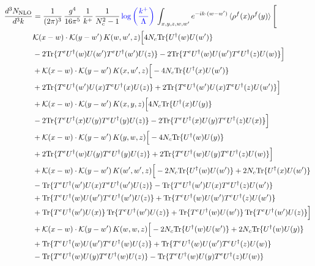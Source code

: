 \documentclass[9pt]{article}
\numberwithin{equation}{section}
\begin{document}
\begin{align}
    \frac{d^{3}N_{\mathrm{NLO}}}{d^{3}k} & = \frac{1}{(2\pi)^{3}}\,\frac{g^{4}}{16\pi^{5}}\,\frac{1}{k^{+}}\,\frac{1}{N^{2}_{c}-1}\,{\color{blue}\log{\left(\frac{k^{+}}{\Lambda}\right)}}\,\int_{x,y,z,w,w'}e^{-ik\cdot(w-w')}\,\langle\rho^{f}(x)\rho^{f}(y) \rangle\,\Bigg[\notag \\ & \mathcal K(x-w)\cdot\mathcal K(y-w')\,K(w,w',z)\Big[4 N_{c}{\rm Tr}\{U^\dagger(w)U(w')\}\notag\\
&-2{\rm Tr}\{T^eU^\dagger(w)U(w')T^eU^\dagger(w')U(z)\}-2{\rm Tr}\{T^eU^\dagger(w)U(w')T^eU^\dagger(z)U(w)\}\Big]\notag\\
&+\mathcal K(x-w)\cdot\mathcal K(y-w')\,K(x,w',z)\Big[-4 N_{c}{\rm Tr}\{U^\dagger(x)U(w')\}\notag\\
&+2{\rm Tr}\{T^eU^\dagger(w')U(x)T^eU^\dagger(x)U(z)\}+2{\rm Tr}\{T^eU^\dagger(w')U(x)T^eU^\dagger(z)U(w')\}\Big]\notag\\
&+\mathcal K(x-w)\cdot\mathcal K(y-w')\,K(x,y,z)\Big[4 N_{c}{\rm Tr}\{U^\dagger(x)U(y)\}\notag\\
&-2{\rm Tr}\{T^eU^\dagger(x)U(y)T^eU^\dagger(y)U(z)\}-2{\rm Tr}\{T^eU^\dagger(x)U(y)T^eU^\dagger(z)U(x)\}\Big]\notag\\
&+\mathcal K(x-w)\cdot\mathcal K(y-w')\,K(y,w,z)\Big[-4 N_{c}{\rm Tr}\{U^\dagger(w)U(y)\}\notag\\
&+2{\rm Tr}\{T^eU^\dagger(w)U(y)T^eU^\dagger(y)U(z)\}+2{\rm Tr}\{T^eU^\dagger(w)U(y)T^eU^\dagger(z)U(w)\}\Big]\notag\\
&+\mathcal K(x-w)\cdot\mathcal K(y-w')\,K(w',w',z)\Big[-2 N_{c}{\rm Tr}\{U^\dagger(w)U(w')\}+2 N_{c}{\rm Tr}\{U^\dagger(x)U(w')\}\notag\\
&-{\rm Tr}\{T^eU^\dagger(w')U(x)T^eU^\dagger(w')U(z)\}-{\rm Tr}\{T^eU^\dagger(w')U(x)T^eU^\dagger(z)U(w')\}\notag\\
&+{\rm Tr}\{T^eU^\dagger(w)U(w')T^eU^\dagger(w')U(z)\}+{\rm Tr}\{T^eU^\dagger(w)U(w')T^eU^\dagger(z)U(w')\}\notag\\
&+{\rm Tr}\{T^eU^\dagger(w')U(x)\}\,{\rm Tr}\{T^eU^\dagger(w')U(z)\}+{\rm Tr}\{T^eU^\dagger(w)U(w')\}\,{\rm Tr}\{T^eU^\dagger(w')U(z)\}\Big]\notag\\
&+\mathcal K(x-w)\cdot\mathcal K(y-w')\,K(w,w,z)\Big[-2 N_{c}{\rm Tr}\{U^\dagger(w)U(w')\}+2 N_{c}{\rm Tr}\{U^\dagger(w)U(y)\}\notag\\
&+{\rm Tr}\{T^eU^\dagger(w)U(w')T^eU^\dagger(w)U(z)\}+{\rm Tr}\{T^eU^\dagger(w)U(w')T^eU^\dagger(z)U(w)\}\notag\\
&-{\rm Tr}\{T^eU^\dagger(w)U(y)T^eU^\dagger(w)U(z)\}-{\rm Tr}\{T^eU^\dagger(w)U(y)T^eU^\dagger(z)U(w)\}\notag\\

\end{align}
\end{document}
